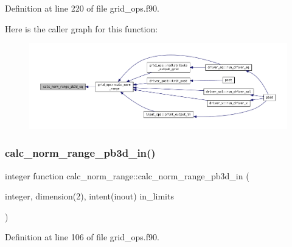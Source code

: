 Definition at line 220 of file grid\+\_\+ops.\+f90.

Here is the caller graph for this function\+:
\nopagebreak
\begin{figure}[H]
\begin{center}
\leavevmode
\includegraphics[width=350pt]{grid__ops_8f90_a868669b6df6c0fa6a8cedd993042f6ea_icgraph}
\end{center}
\end{figure}
\mbox{\label{grid__ops_8f90_aebe21d718069318bced62bc3d2d09393}} 
\subsubsection{\texorpdfstring{calc\+\_\+norm\+\_\+range\+\_\+pb3d\+\_\+in()}{calc\_norm\_range\_pb3d\_in()}}
{\footnotesize\ttfamily integer function calc\+\_\+norm\+\_\+range\+::calc\+\_\+norm\+\_\+range\+\_\+pb3d\+\_\+in (\begin{DoxyParamCaption}\item[{integer, dimension(2), intent(inout)}]{in\+\_\+limits }\end{DoxyParamCaption})}



Definition at line 106 of file grid\+\_\+ops.\+f90.

